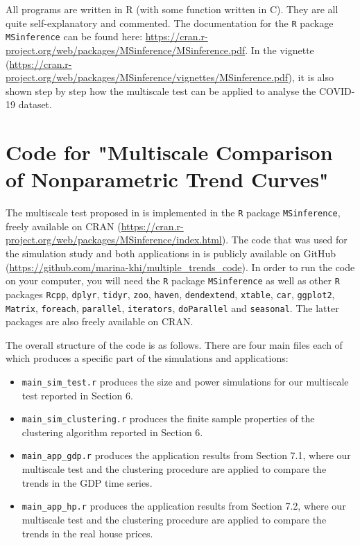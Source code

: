 \documentclass[a4paper,12pt]{article}
\begin{document}
All programs are written in R (with some function written in C). They are all quite self-explanatory and commented. The documentation for the \verb|R| package \verb|MSinference| can be found here: \url{https://cran.r-project.org/web/packages/MSinference/MSinference.pdf}. In the vignette (\url{https://cran.r-project.org/web/packages/MSinference/vignettes/MSinference.pdf}), it is also shown step by step how the multiscale test can be applied to analyse the COVID-19 dataset.

\newpage
\section{Code for "Multiscale Comparison of Nonparametric Trend Curves"}

The multiscale test proposed in \cite{KhismatullinaVogt2022} is implemented in the \verb|R| package \verb|MSinference|, freely available on CRAN (\url{https://cran.r-project.org/web/packages/MSinference/index.html}). The code that was used for the simulation study and both applications in \cite{KhismatullinaVogt2022} is publicly available on GitHub (\url{https://github.com/marina-khi/multiple_trends_code}). In order to run the code on your computer, you will need the \verb|R| package \verb|MSinference| as well as other \verb|R| packages \verb|Rcpp|, \verb|dplyr|, \verb|tidyr|, \verb|zoo|, \verb|haven|, \verb|dendextend|, \verb|xtable|, \verb|car|, \verb|ggplot2|, \verb|Matrix|, \verb|foreach|, \verb|parallel|, \verb|iterators|, \verb|doParallel| and \verb|seasonal|. The latter packages are also freely available on CRAN.


The overall structure of the code is as follows.  There are four main files each of which produces a specific part of the simulations and applications:

\begin{itemize}
\item \verb|main_sim_test.r| produces the size and power simulations for our multiscale test reported in Section 6.
\item \verb|main_sim_clustering.r| produces the finite sample properties of the clustering algorithm reported in Section 6.
\item \verb|main_app_gdp.r| produces the application results from Section 7.1, where our multiscale test and the clustering procedure are applied to compare the trends in the GDP time series.
\item \verb|main_app_hp.r| produces the application results from Section 7.2, where our multiscale test and the clustering procedure are applied to compare the trends in the real house prices.
\end{itemize}
\end{document}
